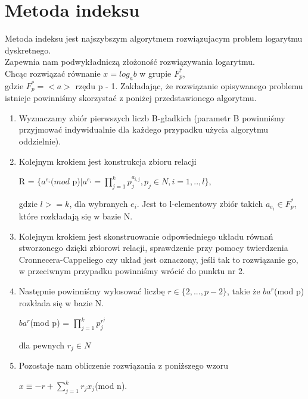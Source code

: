 \documentclass{article}
\begin{document}
\newpage

\section{Metoda indeksu}
Metoda indeksu jest najszybszym algorytmem rozwiązujacym problem logarytmu dyskretnego.\\
Zapewnia nam podwykładniczą złożoność rozwiązywania logarytmu.\\
Chcąc rozwiązać równanie $x=log_ab$ w grupie $F_p^*$,\\
gdzie $F_p^* = <a>$ rzędu p - 1. Zakładając, że rozwiązanie opisywanego problemu istnieje powinniśmy skorzystać z poniżej przedstawionego algorytmu.
\begin{enumerate}
    \item  Wyznaczamy zbiór pierwszych liczb B-gładkich (parametr B powinniśmy przyjmować indywidualnie dla każdego przypadku użycia algorytmu oddzielnie).
    \item Kolejnym krokiem jest konstrukcja zbioru relacji
    \begin{center}
        R = $\{a^{e_i}(mod$ p)$| a^{e_i} =  \prod_{j = 1}^{k} p_j^{a_{i,j}}, p_j \in N, i = 1, .. ,l\} $,\\
    \end{center}
    gdzie $l >= k$, dla wybranych $e_i$. Jest to l-elementowy zbiór takich $a_{e_i} \in F_p^*$, które rozkładają się w bazie N.
    \item Kolejnym krokiem jest skonstruowanie odpowiedniego układu równań stworzonego dzięki zbiorowi relacji, sprawdzenie przy pomocy twierdzenia Cronnecera-Cappeliego czy układ jest oznaczony, jeśli tak to rozwiązanie go, w przeciwnym przypadku powinniśmy wrócić do punktu nr 2.
    \item Następnie powinniśmy wylosować liczbę $r \in \{2, ..., p-2\}$, takie że $ba^r$(mod p) rozkłada się w bazie N. 
    \begin{center}
        $ba^r$(mod p) = $\prod_{j = 1}^{k} p_j^{r^j}$
    \end{center}
    dla pewnych $r_j \in N$
    \item Pozostaje nam obliczenie rozwiązania z poniższego wzoru\\
    \begin{center}
        $x \equiv -r + \sum_{j=1}^{k} r_jx_j$(mod n).
    \end{center}
\end{enumerate}
 
\end{document}
